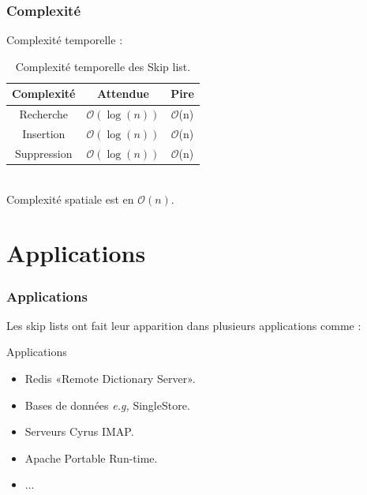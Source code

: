 \documentclass{beamer}
\begin{document}
\begin{frame}
	\frametitle{Complexité}
	
	Complexité temporelle :
		\begin{table}[h]  
		\centering
		\begin{tabular}{|c|c|c|}
			\hline
			Complexité  		&  Attendue        &  Pire          \\
			\hline
			Recherche   		& $\mathcal{O}(\log(n))$ &  $\mathcal{O}$(n)   \\	
			\hline
			Insertion   		& $\mathcal{O}(\log(n))$ &  $\mathcal{O}$(n)   \\	
			\hline
			Suppression 		& $\mathcal{O}(\log(n))$ &  $\mathcal{O}$(n)   \\	
			\hline
		\end{tabular}
		\caption{Complexité temporelle des Skip list.} 		
	\end{table}
	 
	 	~\\[.4cm]
	 	
	 Complexité spatiale est en $\mathcal{O}(n)$.
	 	 
\end{frame}	


\section[Applications]{Applications} 

\begin{frame} 
	
	\frametitle{Applications}
	
	Les skip lists ont fait leur apparition dans plusieurs applications comme :
	~\\[.4cm]
	\begin{block}{Applications \cite{Wikipedia}}
		~\\[.4cm]
		\begin{itemize} %
		\item Redis «Remote Dictionary Server».\\[.4cm]	
		\item Bases de données \textit{e.g,} SingleStore. \\[.4cm]
		\item Serveurs Cyrus IMAP.	\\[.4cm]	
		\item Apache Portable Run-time.
		\item ...	
		\end{itemize}
	~\\[.4cm]
	\end{block}

\end{frame}	
\end{document}
